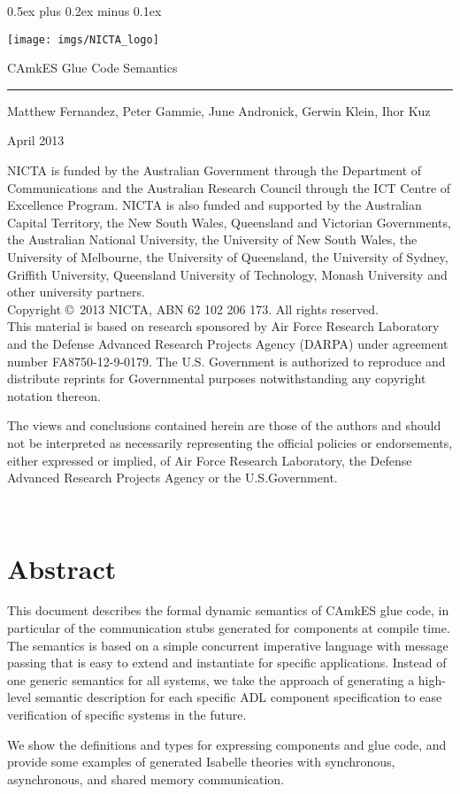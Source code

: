 \documentclass[11pt,a4paper]{scrreprt}
\date{\small\today}
\date{}
\newcommand{\camkes}{CAmkES\xspace}
\newcommand{\titl}{CAmkES Glue Code Semantics}
\newcommand{\authors}{Matthew Fernandez, Peter Gammie, June Andronick, Gerwin Klein, Ihor Kuz}
\newcommand{\nictafundingacknowledgement}{%
NICTA is funded by the Australian Government through the Department of Communications and the Australian Research Council through the ICT Centre of Excellence Program. NICTA is also funded and supported by the Australian Capital Territory, the New South Wales, Queensland and Victorian Governments, the Australian National University, the University of New South Wales, the University of Melbourne, the University of Queensland, the University of Sydney, Griffith University, Queensland University of Technology, Monash University and other university partners.}
\newcommand{\ABN}{ABN 62 102 206 173}
\newcommand{\cpright}{Copyright \copyright\ 2013 NICTA, \ABN.  All rights reserved.}
\newcommand{\trdisclaimer}{%
This material is based on research sponsored by Air Force Research Laboratory
and the Defense Advanced Research Projects Agency (DARPA) under agreement number
FA8750-12-9-0179. The U.S. Government is authorized to reproduce and distribute
reprints for Governmental purposes notwithstanding any copyright notation
thereon.

The views and conclusions contained herein are those of the authors and should
not be interpreted as necessarily representing the official policies or
endorsements, either expressed or implied, of Air Force Research Laboratory,
the Defense Advanced Research Projects Agency or the U.S.Government.}
\newcommand{\smalldisclaimer}{}
\newcommand{\bigdisclaimer}{%
\nictafundingacknowledgement\\

\cpright\\

\vspace{2ex}
\noindent\trdisclaimer}
\newcommand{\pgstyle}{%
\fancyhf{}%
\renewcommand{\headrulewidth}{0pt}%
\fancyfoot[C]{}%
\fancyfoot[L]{\smalldisclaimer}%
\fancyfoot[R]{\sl\thepage}}
\begin{document}
\parindent 0pt\parskip 0.5ex plus 0.2ex minus 0.1ex


\begin{center}
 \texttt{[image: imgs/NICTA\_logo]}
\end{center}

\vspace{14ex}
\textsf{\huge \titl}


\vspace{4ex}
\rule{0.85\textwidth}{5pt}
\vspace{4ex}

{\large \authors

\vspace{2ex}
April 2013}

\vfill
{\small
\bigdisclaimer
}

\thispagestyle{empty}
\newpage
~
\restoregeometry

\fancypagestyle{empty}{\pgstyle}
\pagestyle{empty}


\cleardoublepage

\chapter*{Abstract}

This document describes the formal dynamic semantics of \camkes glue code, in
particular of the communication stubs generated for components at compile
time. The semantics is based on a simple concurrent imperative language with
message passing that is easy to extend and instantiate for specific
applications. Instead of one generic semantics for all systems, we take the
approach of generating a high-level semantic description for each specific
ADL component specification to ease verification of specific systems in
the future.

We show the definitions and types for expressing components and glue code, and
provide some examples of generated Isabelle theories with synchronous,
asynchronous, and shared memory communication.


\cleardoublepage
\tableofcontents







\end{document}
